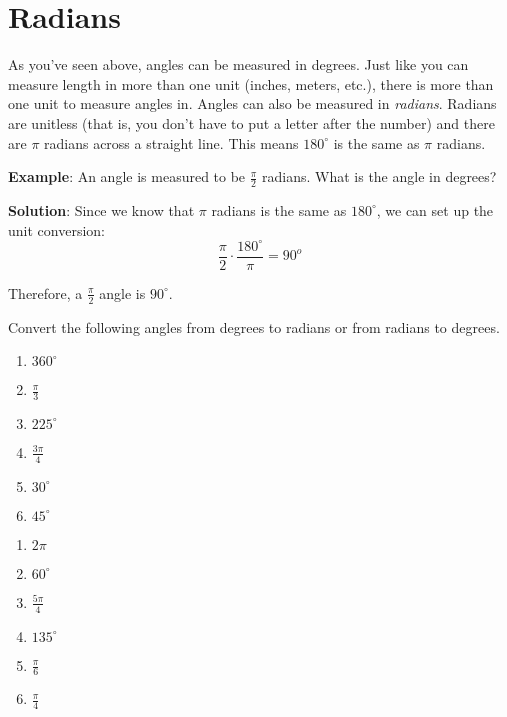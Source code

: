 \section{Radians}
As you've seen above, angles can be measured in degrees. Just like you can 
measure length in more than one unit (inches, meters, etc.), there is more 
than one unit to measure angles in. Angles can also be measured in \textit{
radians}. Radians are unitless (that is, you don't have to put 
a letter after the number) and there are $\pi$ radians across a straight line. 
This means $180^\circ$ is the same as $\pi$ radians. 

\textbf{Example}: An angle is measured to be $\frac{\pi}{2}$ radians. What is 
the angle in degrees?

\textbf{Solution}: Since we know that $\pi$ radians is the same as $180^\circ$,
we can set up the unit conversion:
$$\frac{\pi}{2} \cdot \frac{180^\circ}{\pi} = 90^o$$

Therefore, a $\frac{\pi}{2}$ angle is $90^\circ$. 

\begin{Exercise}[label = radians]
Convert the following angles from degrees to radians or from radians to degrees. 
\begin{enumerate}
\item $360^\circ$
\item $\frac{\pi}{3}$
\item $225^\circ$
\item $\frac{3\pi}{4}$
\item $30^\circ$
\item $45^\circ$
\end{enumerate}
\end{Exercise}

\begin{Answer}[ref = radians]
\begin{enumerate}
\item $2\pi$
\item $60^\circ$
\item $\frac{5\pi}{4}$
\item $135^\circ$
\item $\frac{\pi}{6}$
\item $\frac{\pi}{4}$
\end{enumerate}
\end{Answer}



